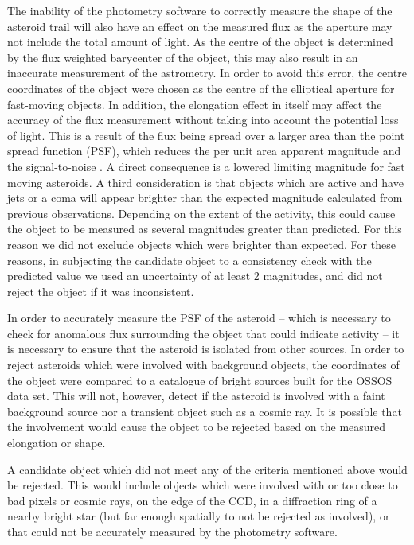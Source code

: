 \documentclass[iop,apj]{emulateapj}
\begin{document}
The inability of the photometry software to correctly measure the shape of the asteroid trail will also have an effect on the measured flux as the aperture may not include the total amount of light. As the centre of the object is determined by the flux weighted barycenter of the object, this may also result in an inaccurate measurement of the astrometry. In order to avoid this error, the centre coordinates of the object were chosen as the centre of the elliptical aperture for fast-moving objects. 
In addition, the elongation effect in itself may affect the accuracy of the flux measurement without taking into account the potential loss of light. This is a result of the flux being spread over a larger area than the point spread function (PSF), which reduces the per unit area apparent magnitude and the signal-to-noise \citep{veres12}. A direct consequence is a lowered limiting magnitude for fast moving asteroids. 
A third consideration is that objects which are active and have jets or a coma will appear brighter than the expected magnitude calculated from previous observations. Depending on the extent of the activity, this could cause the object to be measured as several magnitudes greater than predicted. For this reason we did not exclude objects which were brighter than expected.  
For these reasons, in subjecting the candidate object to a consistency check with the predicted value we used an uncertainty of at least 2 magnitudes, and did not reject the object if it was inconsistent.

In order to accurately measure the PSF of the asteroid -- which is necessary to check for anomalous flux surrounding the object that could indicate activity -- it is necessary to ensure that the asteroid is isolated from other sources. In order to reject asteroids which were involved with background objects, the coordinates of the object were compared to a catalogue of bright sources built for the OSSOS data set. This will not, however, detect if the asteroid is involved with a faint background source nor a transient object such as a cosmic ray. It is possible that the involvement would cause the object to be rejected based on the measured elongation or shape. 

A candidate object which did not meet any of the criteria mentioned above would be rejected. This would include objects which were involved with or too close to bad pixels or cosmic rays, on the edge of the CCD, in a diffraction ring of a nearby bright star (but far enough spatially to not be rejected as involved), or that could not be accurately measured by the photometry software.
\end{document}
